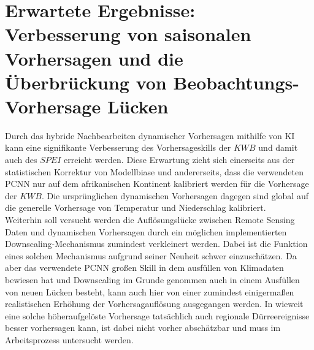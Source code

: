 \documentclass[ba-expose-lentz.tex]{subfile}
\begin{document}
{\let\clearpage\relax \chapter{Erwartete Ergebnisse: Verbesserung von saisonalen Vorhersagen und die Überbrückung von Beobachtungs-Vorhersage Lücken}}\label{ergebnisse}

Durch das hybride Nachbearbeiten dynamischer Vorhersagen mithilfe von KI kann eine signifikante Verbesserung des Vorhersageskills der $KWB$ und damit auch des $SPEI$ erreicht werden.
Diese Erwartung zieht sich einerseits aus der statistischen Korrektur von Modellbiase und andererseits, dass die verwendeten PCNN nur auf dem afrikanischen Kontinent kalibriert werden für die Vorhersage der $KWB$.
Die ursprünglichen dynamischen Vorhersagen dagegen sind global auf die generelle Vorhersage von Temperatur und Niederschlag kalibriert. \\
Weiterhin soll versucht werden die Auflösungslücke zwischen Remote Sensing Daten und dynamischen Vorhersagen durch ein möglichen implementierten Downscaling-Mechanismus zumindest verkleinert werden.
Dabei ist die Funktion eines solchen Mechanismus aufgrund seiner Neuheit schwer einzuschätzen.
Da aber das verwendete PCNN großen Skill in dem ausfüllen von Klimadaten bewiesen hat \parencite{lentz_improving_2025} und Downscaling im Grunde genommen auch in einem Ausfüllen von neuen Lücken besteht, kann auch hier von einer zumindest einigermaßen realistischen Erhöhung der Vorhersagauflösung ausgegangen werden.
In wieweit eine solche höheraufgelöste Vorhersage tatsächlich auch regionale Dürreereignisse besser vorhersagen kann, ist dabei nicht vorher abschätzbar und muss im Arbeitsprozess untersucht werden.
\end{document}

